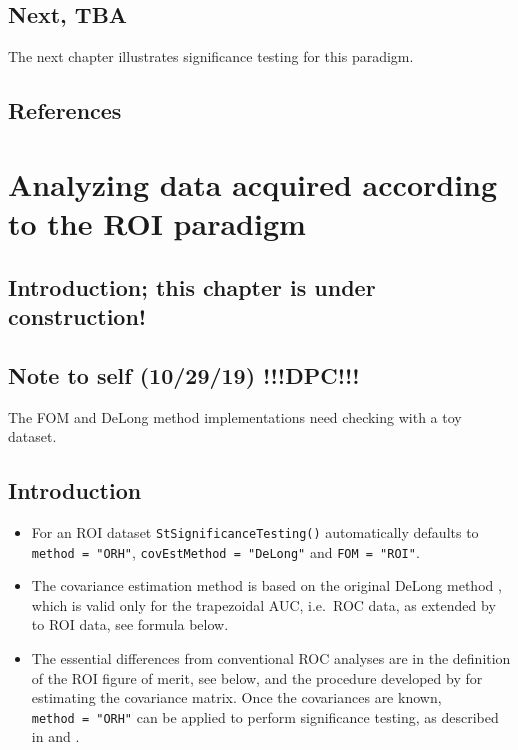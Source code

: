 \documentclass[
]{book}
\begin{document}
\hypertarget{next-tba}{%
\section{Next, TBA}\label{next-tba}}

The next chapter illustrates significance testing for this paradigm.

\hypertarget{references-11}{%
\section{References}\label{references-11}}

\hypertarget{ROIDataAnalysis}{%
\chapter{Analyzing data acquired according to the ROI paradigm}\label{ROIDataAnalysis}}

\hypertarget{introduction-this-chapter-is-under-construction-1}{%
\section{Introduction; this chapter is under construction!}\label{introduction-this-chapter-is-under-construction-1}}

\hypertarget{note-to-self-102919-dpc}{%
\section{Note to self (10/29/19) !!!DPC!!!}\label{note-to-self-102919-dpc}}

The FOM and DeLong method implementations need checking with a toy dataset.

\hypertarget{introduction-15}{%
\section{Introduction}\label{introduction-15}}

\begin{itemize}
\item
  For an ROI dataset \texttt{StSignificanceTesting()} automatically defaults to \texttt{method\ =\ "ORH"}, \texttt{covEstMethod\ =\ "DeLong"} and \texttt{FOM\ =\ "ROI"}.
\item
  The covariance estimation method is based on the original DeLong method \citep{RN112}, which is valid only for the trapezoidal AUC, i.e.~ROC data, as extended by \citep{RN1233} to ROI data, see formula below.
\item
  The essential differences from conventional ROC analyses are in the definition of the ROI figure of merit, see below, and the procedure developed by \citep{RN1233} for estimating the covariance matrix. Once the covariances are known, \texttt{method\ =\ "ORH"} can be applied to perform significance testing, as described in \citep{RN1450} and \citep[Chapter 10]{RN2680}.
\end{itemize}
\end{document}
